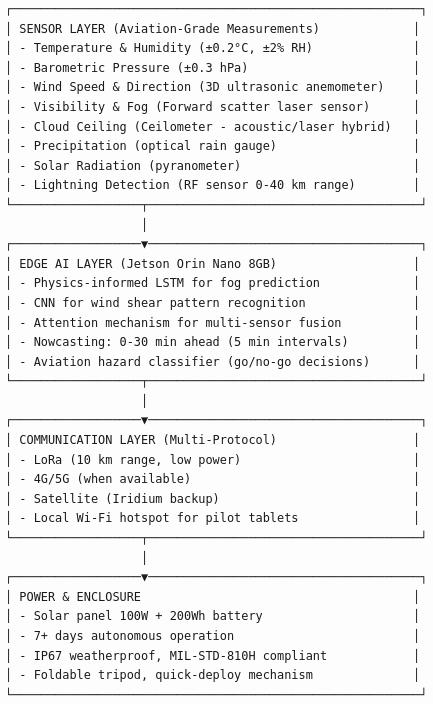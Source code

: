 \begin{verbatim}
┌─────────────────────────────────────────────────────────┐
│ SENSOR LAYER (Aviation-Grade Measurements)             │
│ - Temperature & Humidity (±0.2°C, ±2% RH)              │
│ - Barometric Pressure (±0.3 hPa)                       │
│ - Wind Speed & Direction (3D ultrasonic anemometer)    │
│ - Visibility & Fog (Forward scatter laser sensor)      │
│ - Cloud Ceiling (Ceilometer - acoustic/laser hybrid)   │
│ - Precipitation (optical rain gauge)                   │
│ - Solar Radiation (pyranometer)                        │
│ - Lightning Detection (RF sensor 0-40 km range)        │
└──────────────────┬──────────────────────────────────────┘
                   │
┌──────────────────▼──────────────────────────────────────┐
│ EDGE AI LAYER (Jetson Orin Nano 8GB)                   │
│ - Physics-informed LSTM for fog prediction             │
│ - CNN for wind shear pattern recognition               │
│ - Attention mechanism for multi-sensor fusion          │
│ - Nowcasting: 0-30 min ahead (5 min intervals)         │
│ - Aviation hazard classifier (go/no-go decisions)      │
└──────────────────┬──────────────────────────────────────┘
                   │
┌──────────────────▼──────────────────────────────────────┐
│ COMMUNICATION LAYER (Multi-Protocol)                   │
│ - LoRa (10 km range, low power)                        │
│ - 4G/5G (when available)                               │
│ - Satellite (Iridium backup)                           │
│ - Local Wi-Fi hotspot for pilot tablets                │
└──────────────────┬──────────────────────────────────────┘
                   │
┌──────────────────▼──────────────────────────────────────┐
│ POWER & ENCLOSURE                                      │
│ - Solar panel 100W + 200Wh battery                     │
│ - 7+ days autonomous operation                         │
│ - IP67 weatherproof, MIL-STD-810H compliant            │
│ - Foldable tripod, quick-deploy mechanism              │
└─────────────────────────────────────────────────────────┘
\end{verbatim}

